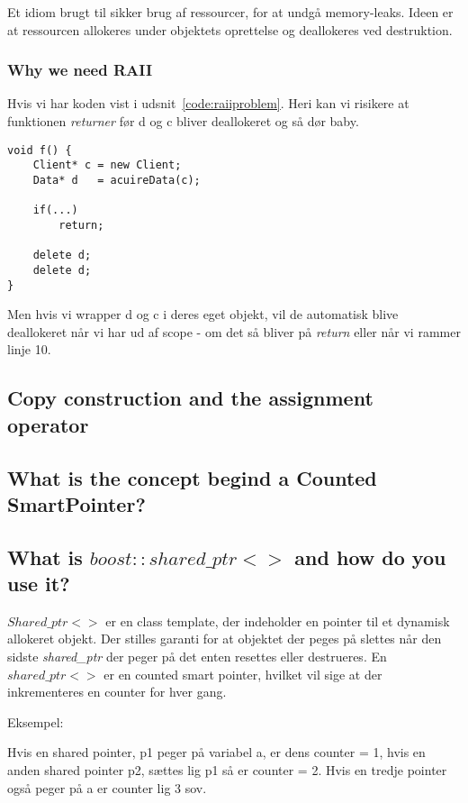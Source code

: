 Et idiom brugt til sikker brug af ressourcer, for at undgå memory-leaks. Ideen er at ressourcen allokeres under objektets oprettelse og deallokeres ved destruktion.

\subsubsection{Why we need RAII}
Hvis vi har koden vist i udsnit~\ref{code:raiiproblem}. Heri kan vi risikere at funktionen \textit{returner} før d og c bliver deallokeret og så dør baby.

\begin{lstlisting}[caption=Problem som skal løses af RAII, label=code:raiiproblem]
void f() {
	Client* c = new Client;
	Data* d   = acuireData(c);
	
	if(...)
		return;
		
	delete d;
	delete d; 
}
\end{lstlisting}

Men hvis vi wrapper d og c i deres eget objekt, vil de automatisk blive deallokeret når vi har ud af scope - om det så bliver på \textit{return} eller når vi rammer linje 10.

\subsection{Copy construction and the assignment operator}


\subsection{What is the concept begind a Counted SmartPointer?}

\subsection{What is $boost::shared\_ptr<>$ and how do you use it?}

$Shared\_ptr<>$ er en class template, der indeholder en pointer til et dynamisk allokeret objekt. Der stilles garanti for at objektet der peges på slettes når den sidste \textit{shared\_ptr} der peger på det enten resettes eller destrueres. En $shared\_ptr<>$ er en counted smart pointer, hvilket vil sige at der inkrementeres en counter for hver gang.

Eksempel:

Hvis en shared pointer, p1 peger på variabel a, er dens counter = 1, hvis en anden shared pointer p2, sættes lig p1 så er counter = 2. Hvis en tredje pointer også peger på a er counter lig 3 sov.

